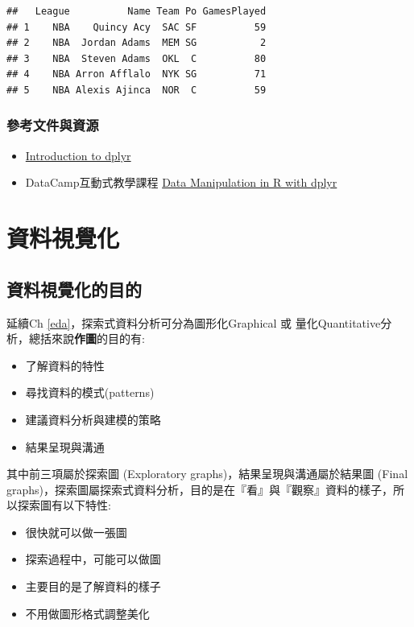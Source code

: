\documentclass[]{book}
\providecommand{\tightlist}{%
  \setlength{\itemsep}{0pt}\setlength{\parskip}{0pt}}
\theoremstyle{definition}
\theoremstyle{definition}
\theoremstyle{remark}
\begin{document}
\begin{verbatim}
##   League          Name Team Po GamesPlayed
## 1    NBA    Quincy Acy  SAC SF          59
## 2    NBA  Jordan Adams  MEM SG           2
## 3    NBA  Steven Adams  OKL  C          80
## 4    NBA Arron Afflalo  NYK SG          71
## 5    NBA Alexis Ajinca  NOR  C          59
\end{verbatim}

\subsection{參考文件與資源}\label{-1}

\begin{itemize}
\tightlist
\item
  \href{https://cran.rstudio.com/web/packages/dplyr/vignettes/introduction.html}{Introduction
  to dplyr}
\item
  DataCamp互動式教學課程
  \href{https://www.datacamp.com/courses/dplyr-data-manipulation-r-tutorial}{Data
  Manipulation in R with dplyr}
\end{itemize}

\chapter{資料視覺化}\label{vis}

\section{資料視覺化的目的}

延續Ch \ref{eda}，探索式資料分析可分為圖形化Graphical 或
量化Quantitative分析，總括來說\textbf{作圖}的目的有:

\begin{itemize}
\tightlist
\item
  了解資料的特性
\item
  尋找資料的模式(patterns)
\item
  建議資料分析與建模的策略
\item
  結果呈現與溝通
\end{itemize}

其中前三項屬於探索圖 (Exploratory graphs)，結果呈現與溝通屬於結果圖
(Final
graphs)，探索圖屬探索式資料分析，目的是在『看』與『觀察』資料的樣子，所以探索圖有以下特性:

\begin{itemize}
\tightlist
\item
  很快就可以做一張圖
\item
  探索過程中，可能可以做圖
\item
  主要目的是了解資料的樣子
\item
  不用做圖形格式調整美化
\end{itemize}
\end{document}
